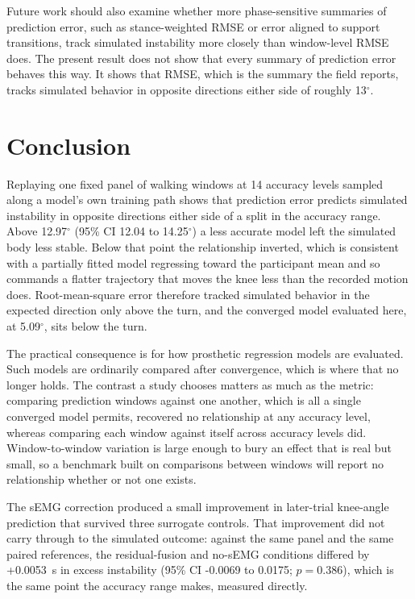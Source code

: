 \documentclass[referee,lineno,pdflatex,sn-vancouver-num]{sn-jnl}
\begin{document}
Future work should also examine whether more phase-sensitive summaries of
prediction error, such as stance-weighted RMSE or error aligned to support
transitions, track simulated instability more closely than window-level RMSE
does. The present result does not show that every summary of prediction error
behaves this way. It shows that RMSE, which is the summary the field reports,
tracks simulated behavior in opposite directions either side of roughly
13$^{\circ}$.

\section{Conclusion}\label{sec:conclusion}

Replaying one fixed panel of walking windows at
14 accuracy levels sampled along a model's own
training path shows that prediction error predicts simulated instability
in opposite directions either side of a split in the accuracy range. Above
12.97$^{\circ}$ (95\% CI
12.04 to 14.25$^{\circ}$) a less accurate model
left the simulated body less stable. Below that point the relationship
inverted, which is consistent with a partially fitted model regressing toward the
participant mean
and so commands a flatter trajectory that moves the knee less than the recorded
motion does. Root-mean-square error therefore tracked
simulated behavior in the expected direction only above the turn, and the
converged model evaluated here,
at
5.09$^{\circ}$, sits below the turn.

The practical consequence is for how prosthetic regression models are evaluated.
Such models are ordinarily compared after convergence, which is where that no
longer holds. The contrast a study chooses
matters as much as the metric: comparing prediction windows against one another,
which is all a single converged model permits, recovered no relationship at any
accuracy level, whereas comparing each window against itself across accuracy
levels did. Window-to-window variation is large enough to bury an effect that is
real but small, so a benchmark built on comparisons between windows will report no
relationship whether or not one exists.

The sEMG correction produced a small improvement in later-trial knee-angle
prediction that survived three surrogate controls. That improvement did not
carry through to the simulated outcome: against the same panel and the same
paired references, the residual-fusion and no-sEMG conditions differed by
+0.0053~s in excess instability (95\% CI
-0.0069 to 0.0175; $p=0.386$), which is the same
point the accuracy range makes, measured directly.
\end{document}
